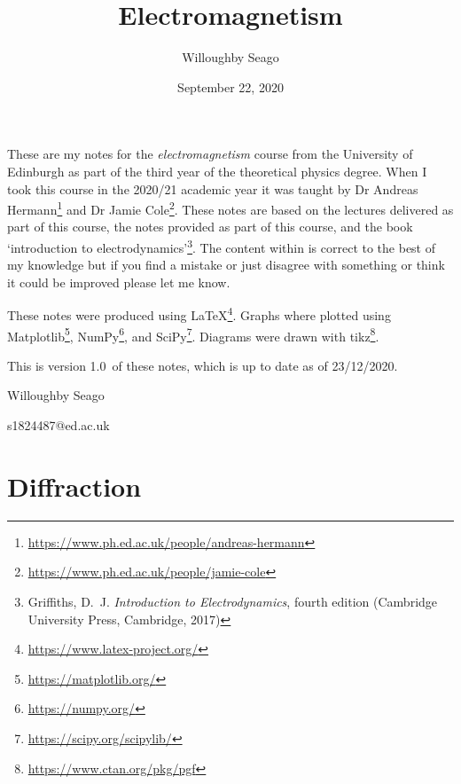 \documentclass[a4paper]{article}
\author{Willoughby Seago}
\date{September 22, 2020}
\title{Electromagnetism}
\newcommand{\notesVersion}{1.0}
\newcommand{\notesDate}{23/12/2020}
\begin{document}
    \maketitle
    These are my notes for the \textit{electromagnetism} course from the University of Edinburgh as part of the third year of the theoretical physics degree.
    When I took this course in the 2020/21 academic year it was taught by Dr Andreas Hermann\footnote{\url{https://www.ph.ed.ac.uk/people/andreas-hermann}} and Dr Jamie Cole\footnote{\url{https://www.ph.ed.ac.uk/people/jamie-cole}}.
    These notes are based on the lectures delivered as part of this course, the notes provided as part of this course, and the book `introduction to electrodynamics'\footnote{Griffiths, D.~J. \textit{Introduction to Electrodynamics}, fourth edition (Cambridge University Press, Cambridge, 2017)}.
    The content within is correct to the best of my knowledge but if you find a mistake or just disagree with something or think it could be improved please let me know.
    
    These notes were produced using \LaTeX\footnote{\url{https://www.latex-project.org/}}.
    Graphs where plotted using Matplotlib\footnote{\url{https://matplotlib.org/}}, NumPy\footnote{\url{https://numpy.org/}}, and SciPy\footnote{\url{https://scipy.org/scipylib/}}.
    Diagrams were drawn with tikz\footnote{\url{https://www.ctan.org/pkg/pgf}}.
    
    This is version \notesVersion~of these notes, which is up to date as of \notesDate.
    \begin{flushright}
        Willoughby Seago
        
        s1824487@ed.ac.uk
    \end{flushright}
    \clearpage
    \tableofcontents
    \listoffigures
    \printglossary[type=\acronymtype, title=Acronyms, style=long]
    \clearpage
    \begingroup
    \let\clearpage\relax  %
    
    
    
    
    
    
    \endgroup
    
    \part{Diffraction}
\end{document}
